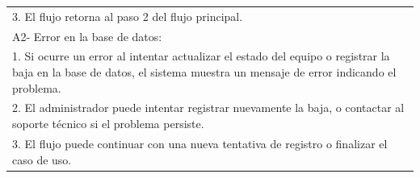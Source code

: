\documentclass[stu, 12pt, letterpaper, donotrepeattitle, floatsintext, natbib]{apa7}
\begin{document}
\begin{longtable}{@{} p{16.5cm} @{}}
    \hspace{1cm}3. El flujo retorna al paso 2 del flujo principal.                                                                                                                                                                      \\
    A2- Error en la base de datos:                                                                                                                                                                                                      \\
    \hspace{1cm}1. Si ocurre un error al intentar actualizar el estado del equipo o registrar la baja en la base de datos, el sistema muestra un mensaje de error indicando el problema.                                                \\
    \hspace{1cm}2. El administrador puede intentar registrar nuevamente la baja, o contactar al soporte t\'ecnico si el problema persiste.                                                                                              \\
    \hspace{1cm}3. El flujo puede continuar con una nueva tentativa de registro o finalizar el caso de uso.                                                                                                                             \\ \bottomrule
\end{longtable}
\newpage
\end{document}
